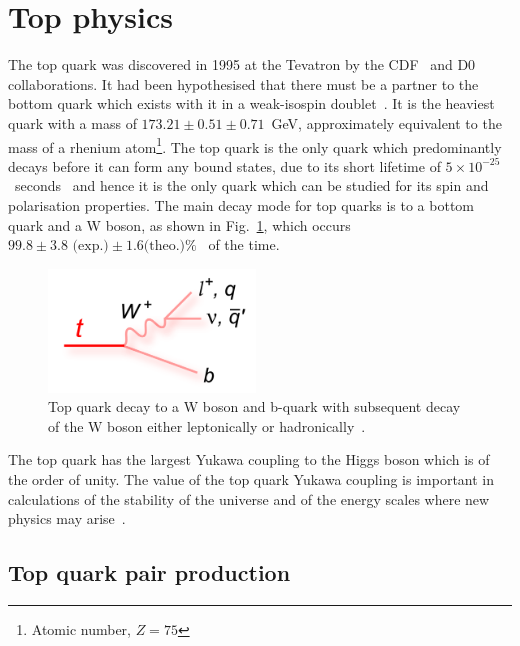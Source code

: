 \section{Top physics}
The top quark was discovered in 1995 at the Tevatron by the CDF~\cite{PhysRevLett.74.2626} and D0~\cite{Abachi:1995iq} collaborations. It had been hypothesised that there must be a partner to the bottom quark which exists with it in a weak-isospin doublet~\cite{Kobayashi:1973fv}. It is the heaviest quark with a mass of $173.21\pm0.51\pm0.71$~GeV, approximately equivalent to the mass of a rhenium atom\footnote{Atomic number, $Z = 75$}. The top quark is the only quark which predominantly decays before it can form any bound states, due to its short lifetime of $5\times10^{-25}$~seconds~\cite{PDG2016} and hence it is the only quark which can be studied for its spin and polarisation properties. The main decay mode for top quarks is to a bottom quark and a W boson, as shown in Fig.~\ref{fig:tdecay}, which occurs $99.8\pm3.8\textrm{ (exp.)}\pm1.6\textrm {(theo.)} \%$~\cite{2014arXiv1403.7366C} of the time.
\begin{figure}[ht!]
\begin{center}
    \includegraphics[width=0.49\textwidth]{images/Theory/topdecay.png}
    \caption{Top quark decay to a W boson and b-quark with subsequent decay of the W boson either leptonically or hadronically~\cite{tdecaysource}.}
    \label{fig:tdecay}
\end{center}
\end{figure}

The top quark has the largest Yukawa coupling to the Higgs boson which is of the order of unity. The value of the top quark Yukawa coupling is important in calculations of the stability of the universe and of the energy scales where new physics may arise~\cite{Bezrukov:2014ina}.

\subsection{Top quark pair production}

